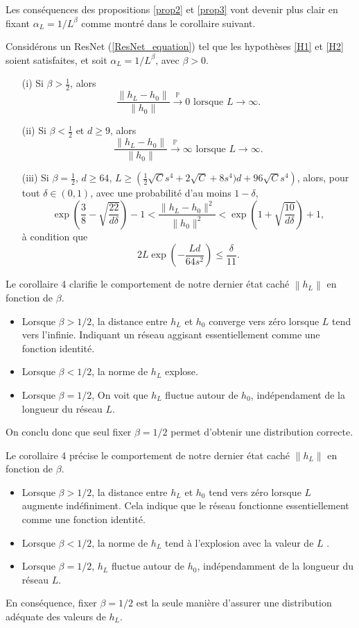 Les conséquences des propositions \ref{prop2} et \ref{prop3} vont devenir plus clair en fixant $ \alpha _L = 1/L ^\beta $ comme montré dans le corollaire suivant.
\begin{cor}\label{cor4}
    Considérons un ResNet (\ref{ResNet_equation}) tel que les hypothèses \ref{H1} et \ref{H2} soient satisfaites, et soit $ \alpha_L = 1/L^\beta $, avec $ \beta > 0 $.
    \begin{itemize}
        \item[(i)] Si $ \beta > \frac{1}{2} $, alors
        \[
            \frac{\|h_L - h_0\|}{\|h_0\|} \xrightarrow{\mathbb{P}} 0 \text{ lorsque } L \to \infty.
        \]
        \item[(ii)] Si $ \beta < \frac{1}{2}$ et $d \geq 9 $, alors
        \[
            \frac{\|h_L - h_0\|}{\|h_0\|} \xrightarrow{\mathbb{P}} \infty \text{ lorsque } L \to \infty.
        \]
        \item[(iii)] Si $ \beta = \frac{1}{2} $, $ d \geq 64$, $L \geq \left(\frac{1}{2}\sqrt{C}s^4 + 2\sqrt{C} + 8s^4)d + 96\sqrt{C}s^4\right) $, alors, pour tout $ \delta \in (0, 1) $, avec une probabilité d'au moins $ 1 - \delta $,
        \[
            \exp\left(\frac{3}{8} - \sqrt{\frac{22}{d\delta}}\right) - 1 < \frac{\|h_L - h_0\|^2}{\|h_0\|^2} < \exp\left(1 + \sqrt{\frac{10}{d\delta}}\right) + 1,
        \]
        à condition que
        \[
            2L \exp\left(-\frac{Ld}{64s^2}\right) \leq \frac{\delta}{11}.
        \]
    \end{itemize}
\end{cor}
Le corollaire 4 clarifie le comportement de notre dernier état caché $ \left\| h_L \right\|  $  en fonction de $ \beta  $. 
\begin{itemize}
    \item Lorsque $ \beta > 1/2 $, la distance entre $ h_L $ et $ h_0 $ converge vers zéro lorsque $ L $ tend vers l'infinie. Indiquant un réseau aggisant essentiellement comme une fonction identité.
    \item Lorsque $ \beta < 1/2 $, la norme de $ h_L $ explose.
    \item Lorsque $ \beta = 1/2 $, On voit que $ h_L $ fluctue autour de $ h_0 $, indépendament de la longueur du réseau $ L $.
\end{itemize}
On conclu donc que seul fixer $ \beta = 1/2 $ permet d'obtenir une distribution correcte.

Le corollaire 4 précise le comportement de notre dernier état caché $\left\| h_L \right\|$ en fonction de $\beta$.
\begin{itemize}
    \item Lorsque $\beta > 1/2$, la distance entre $h_L$ et $h_0$ tend vers zéro lorsque $L$ augmente indéfiniment. Cela indique que le réseau fonctionne essentiellement comme une fonction identité.
    \item Lorsque $\beta < 1/2$, la norme de $h_L$ tend à l'explosion avec la valeur de $ L $ .
    \item Lorsque $\beta = 1/2$, $h_L$ fluctue autour de $h_0$, indépendamment de la longueur du réseau $L$.
\end{itemize}
En conséquence, fixer $\beta = 1/2$ est la seule manière d'assurer une distribution adéquate des valeurs de $h_L$.


